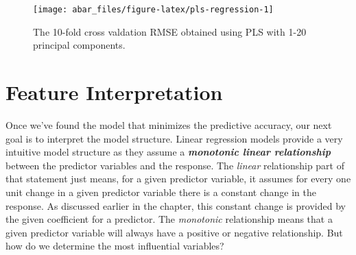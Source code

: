 \documentclass[]{book}
\newenvironment{Shaded}{\begin{snugshade}}{\end{snugshade}}
\newcommand{\CommentTok}[1]{\textcolor[rgb]{0.56,0.35,0.01}{\textit{#1}}}
\newcommand{\DataTypeTok}[1]{\textcolor[rgb]{0.13,0.29,0.53}{#1}}
\newcommand{\DecValTok}[1]{\textcolor[rgb]{0.00,0.00,0.81}{#1}}
\newcommand{\KeywordTok}[1]{\textcolor[rgb]{0.13,0.29,0.53}{\textbf{#1}}}
\newcommand{\NormalTok}[1]{#1}
\newcommand{\OperatorTok}[1]{\textcolor[rgb]{0.81,0.36,0.00}{\textbf{#1}}}
\newcommand{\StringTok}[1]{\textcolor[rgb]{0.31,0.60,0.02}{#1}}
\theoremstyle{definition}
\theoremstyle{definition}
\theoremstyle{definition}
\theoremstyle{remark}
\begin{document}
\begin{Shaded}
\end{Shaded}

\begin{figure}

{\centering \texttt{[image: abar\_files/figure-latex/pls-regression-1]} 

}

\caption{The 10-fold cross valdation RMSE obtained using PLS with 1-20 principal components.}\label{fig:pls-regression}
\end{figure}

\hypertarget{lm-model-interp}{%
\section{Feature Interpretation}\label{lm-model-interp}}

Once we've found the model that minimizes the predictive accuracy, our
next goal is to interpret the model structure. Linear regression models
provide a very intuitive model structure as they assume a
\textbf{\emph{monotonic linear relationship}} between the predictor
variables and the response. The \emph{linear} relationship part of that
statement just means, for a given predictor variable, it assumes for
every one unit change in a given predictor variable there is a constant
change in the response. As discussed earlier in the chapter, this
constant change is provided by the given coefficient for a predictor.
The \emph{monotonic} relationship means that a given predictor variable
will always have a positive or negative relationship. But how do we
determine the most influential variables?
\end{document}
